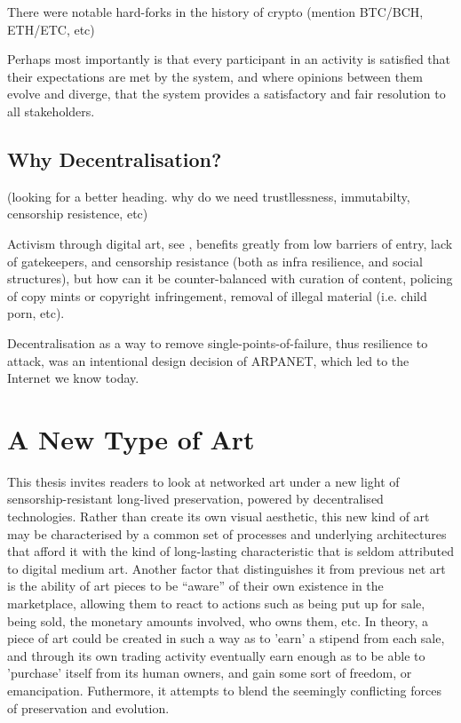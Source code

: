 There were notable hard-forks in the history of crypto (mention BTC/BCH, ETH/ETC, etc)

Perhaps most importantly is that every participant in an activity is satisfied that their expectations are met by the system, and where opinions between them evolve and diverge, that the system provides a satisfactory and fair resolution to all stakeholders. 

\subsection{Why Decentralisation?}
(looking for a better heading. why do we need trustllessness, immutabilty, censorship resistence, etc)

Activism through digital art, see \cite[p.~212]{hopeDigitalArtsIntroduction2014} , benefits greatly from low barriers of entry, lack of gatekeepers, and censorship resistance (both as infra resilience, and social structures), but how can it be counter-balanced with curation of content, policing of copy mints or copyright infringement, removal of illegal material (i.e. child porn, etc).

Decentralisation as a way to remove single-points-of-failure, thus resilience to attack, was an intentional design decision of ARPANET, which led to the Internet we know today. \cite[p.10]{paulDigitalArt2015}



\section{A New Type of Art}

This thesis invites readers to look at networked art under a new light of sensorship-resistant long-lived preservation, powered by decentralised technologies. Rather than create its own visual aesthetic, this new kind of art may be characterised by a common set of processes and underlying architectures that afford it with the kind of long-lasting characteristic that is seldom attributed to digital medium art.
Another factor that distinguishes it from previous net art is the ability of art pieces to be ``aware'' of their own existence in the marketplace, allowing them to react to actions such as being put up for sale, being sold, the monetary amounts involved, who owns them, etc.
In theory, a piece of art could be created in such a way as to 'earn' a stipend from each sale, and through its own trading activity eventually earn enough as to be able to 'purchase' itself from its human owners, and gain some sort of freedom, or emancipation.
Futhermore, it attempts to blend the seemingly conflicting forces of preservation and evolution.

